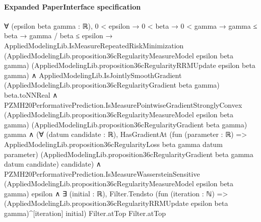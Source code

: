 \documentclass[10pt]{article}
\begin{document}
\paragraph{Expanded PaperInterface specification}
\begin{ReviewVerbatim}
∀ (epsilon beta gamma : ℝ),
  0 < epsilon →
    0 < beta →
      0 < gamma →
        gamma ≤ beta →
          gamma / beta ≤ epsilon →
            AppliedModelingLib.IsMeasureRepeatedRiskMinimization
                (AppliedModelingLib.proposition36cRegularityMeasureModel epsilon beta gamma)
                (AppliedModelingLib.proposition36cRegularityRRMUpdate epsilon beta gamma) ∧
              AppliedModelingLib.IsJointlySmoothGradient
                  (AppliedModelingLib.proposition36cRegularityGradient beta gamma) beta.toNNReal ∧
                PZMH20PerformativePrediction.IsMeasurePointwiseGradientStronglyConvex
                    (AppliedModelingLib.proposition36cRegularityMeasureModel epsilon beta gamma)
                    (AppliedModelingLib.proposition36cRegularityGradient beta gamma) gamma ∧
                  (∀ (datum candidate : ℝ),
                      HasGradientAt
                        (fun (parameter : ℝ) =>
                          AppliedModelingLib.proposition36cRegularityLoss beta gamma datum parameter)
                        (AppliedModelingLib.proposition36cRegularityGradient beta gamma datum candidate) candidate) ∧
                    PZMH20PerformativePrediction.IsMeasureWassersteinSensitive
                        (AppliedModelingLib.proposition36cRegularityMeasureModel epsilon beta gamma) epsilon ∧
                      ∃ (initial : ℝ),
                        Filter.Tendsto
                          (fun (iteration : ℕ) =>
                            (AppliedModelingLib.proposition36cRegularityRRMUpdate epsilon beta gamma)^[iteration]
                              initial)
                          Filter.atTop Filter.atTop
\end{ReviewVerbatim}
\end{document}
